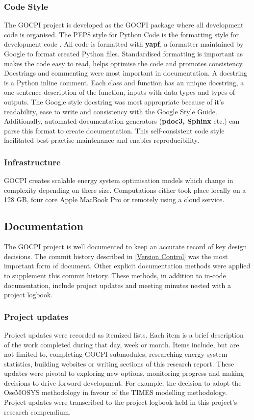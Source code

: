 \documentclass[12pt]{article}
\begin{document}
\subsubsection{Code Style} \label{CS}
The GOCPI project is developed as the GOCPI package where all development code is organised.
The PEP8 style for Python Code is the formatting style for development code \cite{PEP8}. 
All code is formatted with \textbf{yapf}, a formatter maintained by Google to format created Python files.
Standardised formatting is important as makes the code easy to read, helps optimise the code and promotes consistency.
Docstrings and commenting were most important in documentation. A docstring is a Python inline comment. 
Each class and function has an unique docstring, a one sentence description of the function, inputs with data types and types of outputs.
The Google style docstring was most appropriate because of it's readability, ease to write and consistency with the Google Style Guide.
Additionally, automated documentation generators (\textbf{pdoc3, Sphinx} etc.) can parse this format to create documentation.
This self-consistent code style facilitated best practise maintenance and enables reproducibility.


\subsubsection{Infrastructure}
GOCPI creates scalable energy system optimisation models which change in complexity depending on there size.
Computations either took place locally on a 128 GB, four core Apple MacBook Pro or remotely using a cloud service. 

\subsection{Documentation}
The GOCPI project is well documented to keep an accurate record of key design decisions.
The commit history described in \ref{Version Control} was the most important form of document.
Other explicit documentation methods were applied to supplement this commit history. 
These methods, in addition to in-code documentation, include project updates and meeting minutes
nested with a project logbook.

\subsubsection{Project updates}
Project updates were recorded as itemized lists.
Each item is a brief description of the work completed during that day, week or month.
Items include, but are not limited to, completing GOCPI submodules, researching energy system statistics, building websites or writing sections of this research report.
These updates were pivotal to exploring new options, monitoring progress and making decisions to drive forward development. 
For example, the decision to adopt the OseMOSYS methodology in favour of the TIMES modelling methodology.
Project updates were transcribed to the project logbook held in this project's research compendium.
\end{document}
